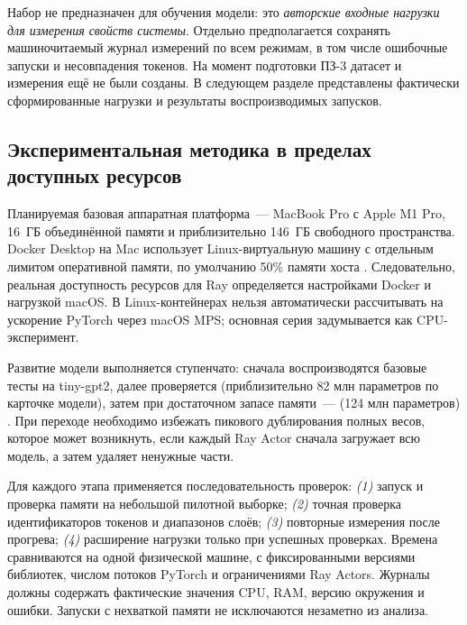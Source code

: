 Набор не предназначен для обучения модели: это \emph{авторские входные нагрузки для измерения свойств системы}. Отдельно предполагается сохранять машиночитаемый журнал измерений по всем режимам, в том числе ошибочные запуски и несовпадения токенов. На момент подготовки ПЗ-3 датасет и измерения ещё не были созданы. В следующем разделе представлены фактически сформированные нагрузки и результаты воспроизводимых запусков.

\subsection{Экспериментальная методика в пределах доступных ресурсов}

Планируемая базовая аппаратная платформа~--- MacBook Pro с Apple M1 Pro, 16~ГБ объединённой памяти и приблизительно 146~ГБ свободного пространства. Docker Desktop на Mac использует Linux-виртуальную машину с отдельным лимитом оперативной памяти, по умолчанию 50\% памяти хоста \cite{dockermemory}. Следовательно, реальная доступность ресурсов для Ray определяется настройками Docker и нагрузкой macOS. В Linux-контейнерах нельзя автоматически рассчитывать на ускорение PyTorch через macOS MPS; основная серия задумывается как CPU-эксперимент.

Развитие модели выполняется ступенчато: сначала воспроизводятся базовые тесты на tiny-gpt2, далее проверяется  (приблизительно 82 млн параметров по карточке модели), затем при достаточном запасе памяти~---  (124 млн параметров) \cite{distilgpt2card,gpt2card}. При переходе необходимо избежать пикового дублирования полных весов, которое может возникнуть, если каждый Ray Actor сначала загружает всю модель, а затем удаляет ненужные части.

Для каждого этапа применяется последовательность проверок: \emph{(1)} запуск и проверка памяти на небольшой пилотной выборке; \emph{(2)} точная проверка идентификаторов токенов и диапазонов слоёв; \emph{(3)} повторные измерения после прогрева; \emph{(4)} расширение нагрузки только при успешных проверках. Времена сравниваются на одной физической машине, с фиксированными версиями библиотек, числом потоков PyTorch и ограничениями Ray Actors. Журналы должны содержать фактические значения CPU, RAM, версию окружения и ошибки. Запуски с нехваткой памяти не исключаются незаметно из анализа.

